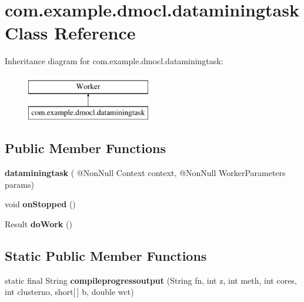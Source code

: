 \hypertarget{classcom_1_1example_1_1dmocl_1_1dataminingtask}{}\section{com.\+example.\+dmocl.\+dataminingtask Class Reference}
\label{classcom_1_1example_1_1dmocl_1_1dataminingtask}
Inheritance diagram for com.\+example.\+dmocl.\+dataminingtask\+:\begin{figure}[H]
\begin{center}
\leavevmode
\includegraphics[height=2.000000cm]{classcom_1_1example_1_1dmocl_1_1dataminingtask}
\end{center}
\end{figure}
\subsection*{Public Member Functions}
\begin{DoxyCompactItemize}
\item 
\mbox{\label{classcom_1_1example_1_1dmocl_1_1dataminingtask_adeb6d5795db66ea5aa050d442ad17959}} 
{\bfseries dataminingtask} ( @Non\+Null Context context, @Non\+Null Worker\+Parameters params)
\item 
\mbox{\label{classcom_1_1example_1_1dmocl_1_1dataminingtask_a3ae06bc9b4443444284c6339c81252c4}} 
void {\bfseries on\+Stopped} ()
\item 
\mbox{\label{classcom_1_1example_1_1dmocl_1_1dataminingtask_a39b5d15f90cab9ac6ce6f0d4d4797261}} 
Result {\bfseries do\+Work} ()
\end{DoxyCompactItemize}
\subsection*{Static Public Member Functions}
\begin{DoxyCompactItemize}
\item 
\mbox{\label{classcom_1_1example_1_1dmocl_1_1dataminingtask_adbc8fcc905465705753dec21be6e9b9f}} 
static final String {\bfseries compileprogressoutput} (String fn, int z, int meth, int cores, int clusterno, short\mbox{[}$\,$\mbox{]} b, double wct)
\end{DoxyCompactItemize}
